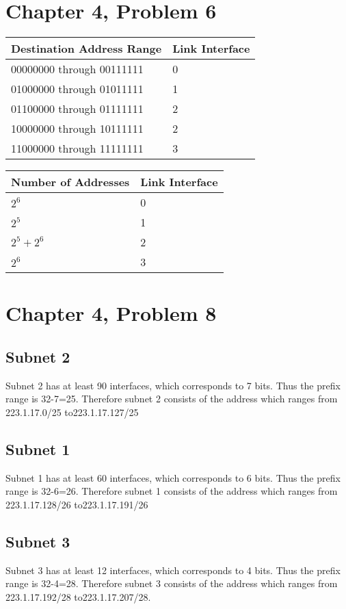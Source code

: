 \documentclass{article}
\begin{document}
\section*{Chapter 4, Problem 6}
\begin{tabular}{ |l|l| }
  \hline
  Destination Address Range & Link Interface \\ \hline
  00000000 through 00111111 & 0 \\ \hline
  01000000 through 01011111 & 1 \\ \hline
  01100000 through 01111111 & 2 \\ \hline
  10000000 through 10111111 & 2 \\ \hline
  11000000 through 11111111 & 3 \\ \hline
\end{tabular}
\begin{tabular}{ |l|l| }
  \hline
  Number of Addresses & Link Interface \\ \hline
   $2^6$ & 0 \\ \hline
   $2^5$ & 1 \\ \hline
   $2^5 + 2^6$ & 2 \\ \hline
   $2^6$ & 3 \\ \hline
\end{tabular}

\section*{Chapter 4, Problem 8}
\subsection*{Subnet 2}
Subnet 2 has at least 90 interfaces, which corresponds to 7 bits.  Thus the prefix range is 32-7=25.  Therefore subnet 2 consists of the address which ranges from 223.1.17.0/25 to223.1.17.127/25 

\subsection*{Subnet 1}
Subnet 1 has at least 60 interfaces, which corresponds to 6 bits.  Thus the prefix range is 32-6=26.  Therefore subnet 1 consists of the address which ranges from 223.1.17.128/26 to223.1.17.191/26 

\subsection*{Subnet 3}
Subnet 3 has at least 12 interfaces, which corresponds to 4 bits.  Thus the prefix range is 32-4=28.  Therefore subnet 3 consists of the address which ranges from 223.1.17.192/28 to223.1.17.207/28.
\end{document}
